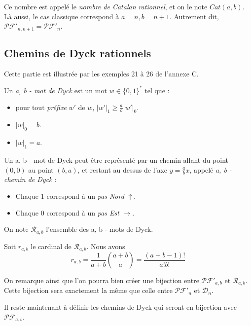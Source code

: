 Ce nombre est appelé le \emph{nombre de Catalan rationnel}, et on le note
$Cat(a,b)$.
Là aussi, le cas classique correspond à $a = n, b = n + 1$.
Autrement dit, $\mathcal{PF'}_{n, n + 1} = \mathcal{PF'}_n$.

\subsection{Chemins de Dyck rationnels}

Cette partie est illustrée par les exemples 21 à 26 de l'annexe C.

\begin{definition}
    Un \emph{a, b - mot de Dyck} est un mot $w \in \{0,1\}^*$ tel que :
    \begin{itemize}
        \item pour tout \emph{préfixe} $w'$ de $w$,
            $\displaystyle |w'|_1 \geqslant \frac{a}{b}|w'|_0$.
        \item $|w|_0 = b$.
        \item $|w|_1 = a$.
    \end{itemize}
\end{definition}

Un a, b - mot de Dyck peut être représenté par un chemin allant du point
$(0,0)$ au point $(b,a)$, et restant au dessus de l'axe $y = \frac{a}{b}x$,
appelé \emph{a, b - chemin de Dyck} :
\begin{itemize}
    \item Chaque $1$ correspond à un \emph{pas Nord} $\uparrow$. 
    \item Chaque $0$ correspond à un \emph{pas Est} $\rightarrow$.
\end{itemize}

On note $\mathcal{R}_{a, b}$ l'ensemble des a, b - mots de Dyck.

\begin{theorem}
    Soit $r_{a,b}$ le cardinal de $\mathcal{R}_{a,b}$.
    Nous avons $$r_{a,b} = \frac{1}{a+b} \binom {a+b}{a} =
    \frac{(a+b-1)!}{a!b!}$$
\end{theorem}

On remarque ainsi que l'on pourra bien créer une bijection entre
$\mathcal{PF'}_{a,b}$ et $\mathcal{R}_{a,b}$.
Cette bijection sera exactement la même que celle entre $\mathcal{PF'}_n$
et $\mathcal{D}_{n}$.

Il reste maintenant à définir les chemins de Dyck qui seront en bijection
avec $\mathcal{PF}_{a,b}$.

